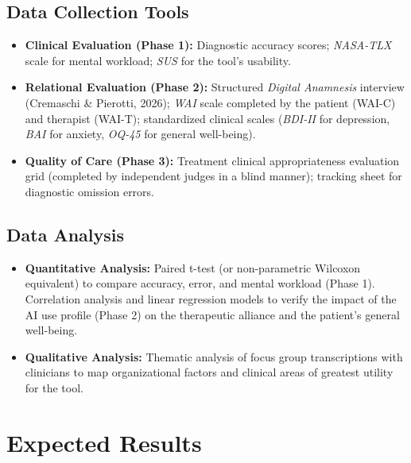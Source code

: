\documentclass[11pt,a4paper]{article}
\begin{document}
\subsection{Data Collection Tools}
\begin{itemize}
    \item \textbf{Clinical Evaluation (Phase 1):} Diagnostic accuracy scores; \textit{NASA-TLX} scale for mental workload; \textit{SUS} for the tool's usability.
    \item \textbf{Relational Evaluation (Phase 2):} Structured \textit{Digital Anamnesis} interview (Cremaschi \& Pierotti, 2026); \textit{WAI} scale completed by the patient (WAI-C) and therapist (WAI-T); standardized clinical scales (\textit{BDI-II} for depression, \textit{BAI} for anxiety, \textit{OQ-45} for general well-being).
    \item \textbf{Quality of Care (Phase 3):} Treatment clinical appropriateness evaluation grid (completed by independent judges in a blind manner); tracking sheet for diagnostic omission errors.
\end{itemize}

\subsection{Data Analysis}
\begin{itemize}
    \item \textbf{Quantitative Analysis:} Paired t-test (or non-parametric Wilcoxon equivalent) to compare accuracy, error, and mental workload (Phase 1). Correlation analysis and linear regression models to verify the impact of the AI use profile (Phase 2) on the therapeutic alliance and the patient's general well-being.
    \item \textbf{Qualitative Analysis:} Thematic analysis of focus group transcriptions with clinicians to map organizational factors and clinical areas of greatest utility for the tool.
\end{itemize}

\section{Expected Results}
\end{document}

